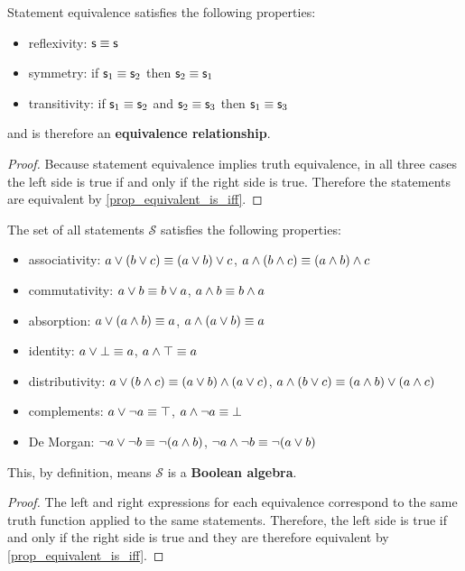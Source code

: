 \documentclass[11pt,letterpaper,fleqn]{memoir} %
\begin{document}
\begin{mathSection}
\begin{coro}
	Statement equivalence satisfies the following properties:
	\begin{itemize}
		\item reflexivity: $\mathsf{s} \equiv \mathsf{s}$
		\item symmetry: if $\mathsf{s}_1 \equiv \mathsf{s}_2$ then $\mathsf{s}_2 \equiv \mathsf{s}_1$
		\item transitivity: if $\mathsf{s}_1 \equiv \mathsf{s}_2$ and $\mathsf{s}_2 \equiv \mathsf{s}_3$ then $\mathsf{s}_1 \equiv \mathsf{s}_3$
	\end{itemize}
	and is therefore an \textbf{equivalence relationship}.
\end{coro}
\begin{proof}
	Because statement equivalence implies truth equivalence, in all three cases the left side is true if and only if the right side is true. Therefore the statements are equivalent by \ref{prop_equivalent_is_iff}.
\end{proof}

	\begin{coro}\label{boolean_properties}
		The set of all statements $\mathcal{S}$ satisfies the following properties:
		\begin{itemize}
			\item associativity: $a \vee (b \vee c) \equiv (a \vee b) \vee c$, $a \wedge (b \wedge c) \equiv (a \wedge b) \wedge c$
			\item commutativity: $a \vee b \equiv b \vee a$, $a \wedge b \equiv b \wedge a$
			\item absorption: $a \vee (a \wedge b) \equiv a$, $a \wedge (a \vee b) \equiv a$
			\item identity: $a \vee \bot \equiv a
			$, $a \wedge \top \equiv a$
			\item distributivity: $a \vee (b \wedge c) \equiv (a \vee b) \wedge (a \vee c)$, $a \wedge (b \vee c) \equiv (a \wedge b) \vee (a \wedge c)$
			\item complements: $a \vee \neg a \equiv \top$, $a \wedge \neg a \equiv \bot$
			\item De Morgan: $\neg a \vee \neg b \equiv \neg (a \wedge b)$, $\neg a \wedge \neg b \equiv \neg (a \vee b)$
		\end{itemize}
		This, by definition, means $\mathcal{S}$ is a \textbf{Boolean algebra}.
	\end{coro}
	\begin{proof}
		The left and right expressions for each equivalence correspond to the same truth function applied to the same statements. Therefore, the left side is true if and only if the right side is true and they are therefore equivalent by \eqref{prop_equivalent_is_iff}.
	\end{proof}
\end{mathSection}
\end{document}
